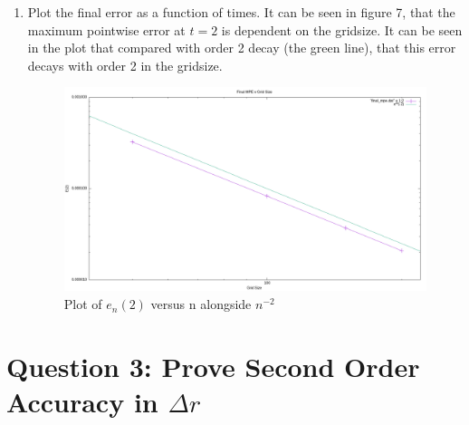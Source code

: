 \documentclass{article}
\begin{document}
\begin{enumerate}[label=\alph*)]
    \item Plot the final error as a function of times. It can be seen in figure
    7, that the maximum pointwise error at $t = 2$ is dependent on the gridsize.
    It can be seen in the plot that compared with order 2 decay (the green
    line), that this error decays with order 2 in the gridsize. 
        \begin{figure}[ht]
            \centering
            \includegraphics[width=.8\textwidth]{final_mpe.png}
            \caption{Plot of $e_n(2)$ versus n alongside $n^{-2}$}
        \end{figure}


\end{enumerate}

\section*{Question 3: Prove Second Order Accuracy in $\Delta r$}
\end{document}
